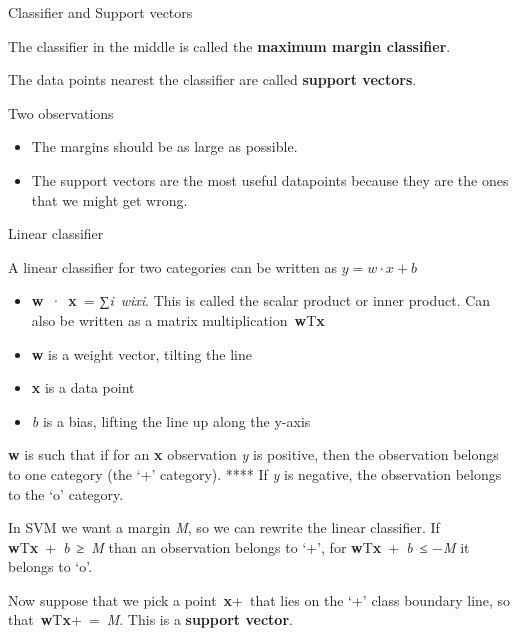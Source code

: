\documentclass[compress]{beamer}
\providecommand{\tightlist}{%
  \setlength{\itemsep}{0pt}\setlength{\parskip}{0pt}}
\begin{document}
\begin{frame}{Classifier and Support vectors}

The classifier in the middle is called the \textbf{maximum margin
classifier}.

The data points nearest the classifier are called \textbf{support
vectors}.

Two observations

\begin{itemize}
\tightlist
\item
  The margins should be as large as possible.
\item
  The support vectors are the most useful datapoints because they are
  the ones that we might get wrong.
\end{itemize}

\end{frame}

\begin{frame}{Linear classifier}

A linear classifier for two categories can be written as
\(y = w \cdot x + b\)

\begin{itemize}
\tightlist
\item
  \textbf{w}~·~\textbf{x}~= ∑\emph{i}~\emph{wixi}. This is called the
  scalar product or inner product. Can also be written as a matrix
  multiplication~\textbf{w}T\textbf{x}
\item
  \textbf{w} is a weight vector, tilting the line
\item
  \textbf{x} is a data point
\item
  \emph{b} is a bias, lifting the line up along the y-axis
\end{itemize}

\textbf{w} is such that if for an \textbf{x} observation \emph{y} is
positive, then the observation belongs to one category (the `+'
category). **** If \emph{y} is negative, the observation belongs to the
`o' category.

In SVM we want a margin \emph{M}, so we can rewrite the linear
classifier. If \textbf{w}T\textbf{x}~+~\emph{b}~≥~\emph{M} than an
observation belongs to `+', for \textbf{w}T\textbf{x}~+~\emph{b}~≤
−\emph{M} it belongs to `o'.

Now suppose that we pick a point~\textbf{x}+~that lies on the `+' class
boundary line, so that~\textbf{w}T\textbf{x}+~=~\emph{M}. This is a
\textbf{support vector}.

\end{frame}
\end{document}

